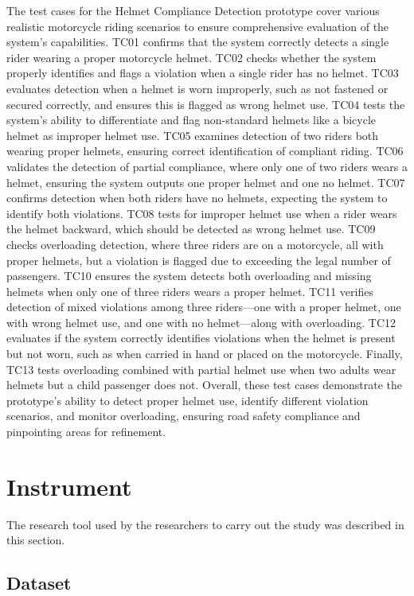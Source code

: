 \begin{refsection}
\noindent
The test cases for the Helmet Compliance Detection prototype cover various realistic motorcycle riding scenarios to ensure comprehensive evaluation of the system’s capabilities. TC01 confirms that the system correctly detects a single rider wearing a proper motorcycle helmet. TC02 checks whether the system properly identifies and flags a violation when a single rider has no helmet. TC03 evaluates detection when a helmet is worn improperly, such as not fastened or secured correctly, and ensures this is flagged as wrong helmet use. TC04 tests the system’s ability to differentiate and flag non-standard helmets like a bicycle helmet as improper helmet use. TC05 examines detection of two riders both wearing proper helmets, ensuring correct identification of compliant riding. TC06 validates the detection of partial compliance, where only one of two riders wears a helmet, ensuring the system outputs one proper helmet and one no helmet. TC07 confirms detection when both riders have no helmets, expecting the system to identify both violations. TC08 tests for improper helmet use when a rider wears the helmet backward, which should be detected as wrong helmet use. TC09 checks overloading detection, where three riders are on a motorcycle, all with proper helmets, but a violation is flagged due to exceeding the legal number of passengers. TC10 ensures the system detects both overloading and missing helmets when only one of three riders wears a proper helmet. TC11 verifies detection of mixed violations among three riders—one with a proper helmet, one with wrong helmet use, and one with no helmet—along with overloading. TC12 evaluates if the system correctly identifies violations when the helmet is present but not worn, such as when carried in hand or placed on the motorcycle. Finally, TC13 tests overloading combined with partial helmet use when two adults wear helmets but a child passenger does not. 
Overall, these test cases demonstrate the prototype’s ability to detect proper helmet use, identify different violation scenarios, and monitor overloading, ensuring road safety compliance and pinpointing areas for refinement.

\section*{Instrument}

    The research tool used by the researchers to carry out the study was described in this section.

\subsection*{Dataset}


\end{refsection}
